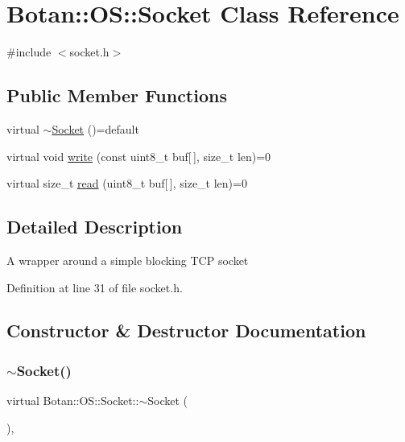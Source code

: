 \hypertarget{class_botan_1_1_o_s_1_1_socket}{}\section{Botan\+:\+:OS\+:\+:Socket Class Reference}
\label{class_botan_1_1_o_s_1_1_socket}


{\ttfamily \#include $<$socket.\+h$>$}

\subsection*{Public Member Functions}
\begin{DoxyCompactItemize}
\item 
virtual \mbox{\hyperlink{class_botan_1_1_o_s_1_1_socket_aacf377bf577d67ed13f1a2e196f4f2ed}{$\sim$\+Socket}} ()=default
\item 
virtual void \mbox{\hyperlink{class_botan_1_1_o_s_1_1_socket_ae342393ce22c475f8197e14c45eee73b}{write}} (const uint8\+\_\+t buf\mbox{[}$\,$\mbox{]}, size\+\_\+t len)=0
\item 
virtual size\+\_\+t \mbox{\hyperlink{class_botan_1_1_o_s_1_1_socket_aa6b883f7ee070a0257ccbf1a7b27ad16}{read}} (uint8\+\_\+t buf\mbox{[}$\,$\mbox{]}, size\+\_\+t len)=0
\end{DoxyCompactItemize}


\subsection{Detailed Description}
A wrapper around a simple blocking T\+CP socket 

Definition at line 31 of file socket.\+h.



\subsection{Constructor \& Destructor Documentation}
\mbox{\label{class_botan_1_1_o_s_1_1_socket_aacf377bf577d67ed13f1a2e196f4f2ed}} 
\subsubsection{\texorpdfstring{$\sim$\+Socket()}{~Socket()}}
{\footnotesize\ttfamily virtual Botan\+::\+O\+S\+::\+Socket\+::$\sim$\+Socket (\begin{DoxyParamCaption}{ }\end{DoxyParamCaption})\hspace{0.3cm}{\ttfamily [virtual]}, {\ttfamily [default]}}

